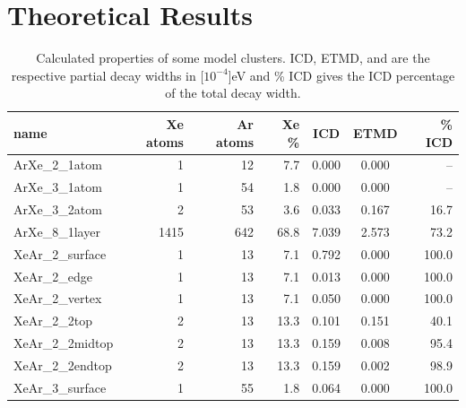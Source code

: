 \section{Theoretical Results}
%
%
\begin{table}[h]
\centering
\caption{Calculated properties of some model clusters. ICD, ETMD, and
are the respective partial decay widths
in \unit[$10^{-4}$]{eV} and \% ICD gives the ICD percentage of the
total decay width.
}
\begin{tabular}{lrrrccr}
\toprule
name                 & Xe atoms & Ar atoms & Xe \% & ICD   &  ETMD & \% ICD\\ %
\midrule
ArXe\_2\_1atom       &      1   &     12   &  7.7  & 0.000 & 0.000 &  --\\ %
ArXe\_3\_1atom       &      1   &     54   &  1.8  & 0.000 & 0.000 &  --\\ %
ArXe\_3\_2atom       &      2   &     53   &  3.6  & 0.033 & 0.167 &  16.7\\ %
ArXe\_8\_1layer      &   1415   &    642   & 68.8  & 7.039 & 2.573 &  73.2\\ %
\midrule
XeAr\_2\_surface     &      1   &     13   &  7.1  & 0.792 & 0.000 & 100.0\\ %
XeAr\_2\_edge        &      1   &     13   &  7.1  & 0.013 & 0.000 & 100.0\\ %
XeAr\_2\_vertex      &      1   &     13   &  7.1  & 0.050 & 0.000 & 100.0\\ %
XeAr\_2\_2top        &      2   &     13   & 13.3  & 0.101 & 0.151 &  40.1\\ %
XeAr\_2\_2midtop     &      2   &     13   & 13.3  & 0.159 & 0.008 &  95.4\\ %
XeAr\_2\_2endtop     &      2   &     13   & 13.3  & 0.159 & 0.002 &  98.9\\ %
XeAr\_3\_surface     &      1   &     55   &  1.8  & 0.064 & 0.000 & 100.0\\ %

\end{tabular}
\end{table}
